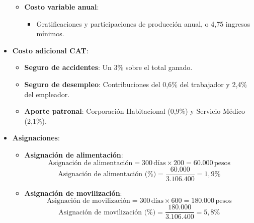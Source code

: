 \begin{itemize}
\begin{itemize}
        \item \textbf{Costo variable anual}:
        \begin{itemize}
            \item Gratificaciones y participaciones de producción anual, o 4,75 ingresos mínimos.
        \end{itemize}
    \end{itemize}
    \item \textbf{Costo adicional CAT}:
    \begin{itemize}
        \item \textbf{Seguro de accidentes}: Un 3\% sobre el total ganado.
        \item \textbf{Seguro de desempleo}: Contribuciones del 0,6\% del trabajador y 2,4\% del empleador.
        \item \textbf{Aporte patronal}: Corporación Habitacional (0,9\%) y Servicio Médico (2,1\%).
    \end{itemize}
    \item \textbf{Asignaciones}:
    \begin{itemize}
        \item \textbf{Asignación de alimentación}:
        \begin{equation}
        \text{Asignación de alimentación} = 300 \, \text{días} \times 200 = 60.000 \, \text{pesos}
        \end{equation}
        \begin{equation}
        \text{Asignación de alimentación (\%)} = \frac{60.000}{3.106.400} = 1,9\%
        \end{equation}
        
        \item \textbf{Asignación de movilización}:
        \begin{equation}
        \text{Asignación de movilización} = 300 \, \text{días} \times 600 = 180.000 \, \text{pesos}
        \end{equation}
        \begin{equation}
        \text{Asignación de movilización (\%)} = \frac{180.000}{3.106.400} = 5,8\%
        \end{equation}
        

\end{itemize}
\end{itemize}
